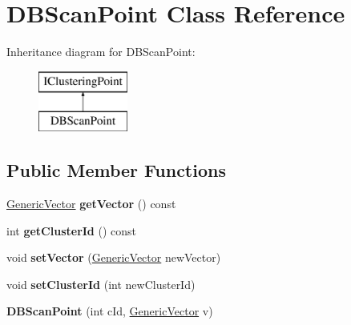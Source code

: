 \hypertarget{classDBScanPoint}{}\section{D\+B\+Scan\+Point Class Reference}
\label{classDBScanPoint}
Inheritance diagram for D\+B\+Scan\+Point\+:\begin{figure}[H]
\begin{center}
\leavevmode
\includegraphics[height=2.000000cm]{classDBScanPoint}
\end{center}
\end{figure}
\subsection*{Public Member Functions}
\begin{DoxyCompactItemize}
\item 
\mbox{\label{classDBScanPoint_a32cb3324ab1ad8c04916fc6ad8f6a47c}} 
\hyperlink{classGenericVector}{Generic\+Vector} {\bfseries get\+Vector} () const
\item 
\mbox{\label{classDBScanPoint_a66abde6747ff669c28e4091b771321d8}} 
int {\bfseries get\+Cluster\+Id} () const
\item 
\mbox{\label{classDBScanPoint_abf0087ee6f609477ec784da2c0f9bc58}} 
void {\bfseries set\+Vector} (\hyperlink{classGenericVector}{Generic\+Vector} new\+Vector)
\item 
\mbox{\label{classDBScanPoint_a2c1b203f4f89ec227e5cc79d5ab8a3ea}} 
void {\bfseries set\+Cluster\+Id} (int new\+Cluster\+Id)
\item 
\mbox{\label{classDBScanPoint_ae069327829be71239e11531b8ac76c93}} 
{\bfseries D\+B\+Scan\+Point} (int c\+Id, \hyperlink{classGenericVector}{Generic\+Vector} v)
\end{DoxyCompactItemize}
